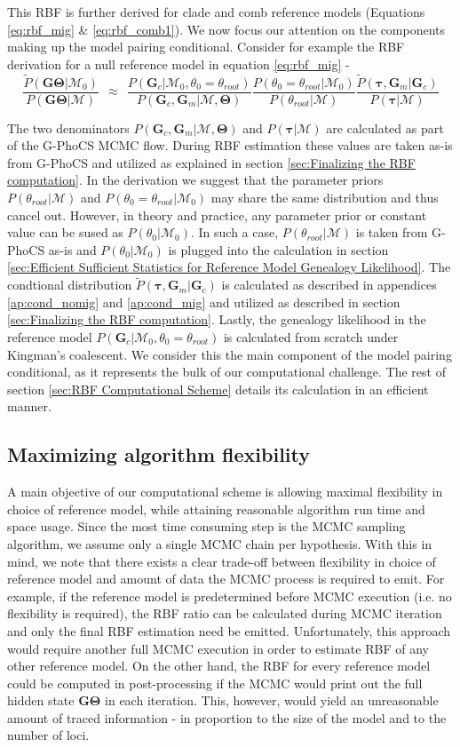 \documentclass[11pt]{article}
\newcommand{\vect}[1]{\boldsymbol{\mathbf{#1}}}
\newcommand{\M}{\mathcal{M}}
\newcommand{\G}{\vect{G}}
\newcommand{\T}{\vect{\Theta}}
\newcommand{\GT}{\G\T}
\newcommand{\Pref}{\widetilde{P}}
\newcommand{\1}{\mathbbm{1}}
\newcommand{\troot}{\theta_{root}}
\newcommand{\Gc}{\G_c}
\newcommand{\Gm}{\G_m}
\newcommand{\gp}{G-PhoCS }
\newcommand{\taus}{\vect\tau}
\begin{document}
This RBF is further derived for clade and comb reference models (Equations  \ref{eq:rbf_mig} \& \ref{eq:rbf_comb1}). 
%
We now focus our attention on the components making up the model pairing conditional. Consider for example the RBF derivation for a null reference model in equation \ref{eq:rbf_mig} - 
\[ 
	\frac{\Pref(\GT|\M_0) }{P(\GT|\M)}
	~~\approx~~ 
	\frac{ P(\Gc|\M_0,\theta_0=\troot) }{ P(\Gc,\Gm|\M,\T)} 
	\frac{ P(\theta_0=\troot|\M_0)}{P(\troot|\M)}
	\frac{ \Pref(\taus,\Gm|\Gc)}{P(\taus|\M)}
\]

The two denominators $P(\Gc,\Gm|\M,\T)$ and $P(\taus|\M)$ are calculated as part of the \gp MCMC flow.
%
During RBF estimation these values are taken as-is from \gp and utilized as explained in section \ref{sec:Finalizing the RBF computation}.
%
%
In the derivation we suggest that the parameter priors $P(\troot|\M)$ and $P(\theta_0=\troot|\M_0)$ may share the same distribution and thus cancel out.
%
However, in theory and practice, any parameter prior or constant value can be sused as $P(\theta_0|\M_0)$.
%
In such a case, $P(\troot|\M)$ is taken from \gp as-is and $P(\theta_0|\M_0)$ is plugged into the calculation in section \ref{sec:Efficient Sufficient Statistics for Reference Model Genealogy Likelihood}.
%
%
The condtional distribution $\Pref(\taus,\Gm|\Gc)$ is calculated as described in appendices \ref{ap:cond_nomig} and \ref{ap:cond_mig} and utilized as described in section \ref{sec:Finalizing the RBF computation}.
%
Lastly, the genealogy likelihood in the reference model $P(\Gc|\M_0,\theta_0=\troot)$ is calculated from scratch under Kingman's coalescent. 
%
We consider this the main component of the model pairing conditional, as it represents the bulk of our computational challenge. The rest of section \ref{sec:RBF Computational Scheme} details its calculation in an efficient manner.

\subsection{Maximizing algorithm flexibility}

A main objective of our computational scheme is allowing maximal flexibility in choice of reference model, while attaining reasonable algorithm run time and space usage.
%
Since the most time consuming step is the MCMC sampling algorithm, we assume only a single MCMC chain per hypothesis.
%
With this in mind, we note that there exists a clear trade-off between flexibility in choice of reference model and amount of data the MCMC process is required to emit. 
%
For example, if the reference model is predetermined before MCMC execution (i.e. no flexibility is required), the RBF ratio can be calculated during MCMC iteration and only the final RBF estimation need be emitted.
%
Unfortunately, this approach would require another full MCMC execution in order to estimate RBF of any other reference model.
%
On the other hand, the RBF for every reference model could be computed in post-processing if the MCMC would print out the full hidden state $\GT$ in each iteration.
%
This, however, would yield an unreasonable amount of traced information - in proportion to the size of the model and to the number of loci.
\end{document}
